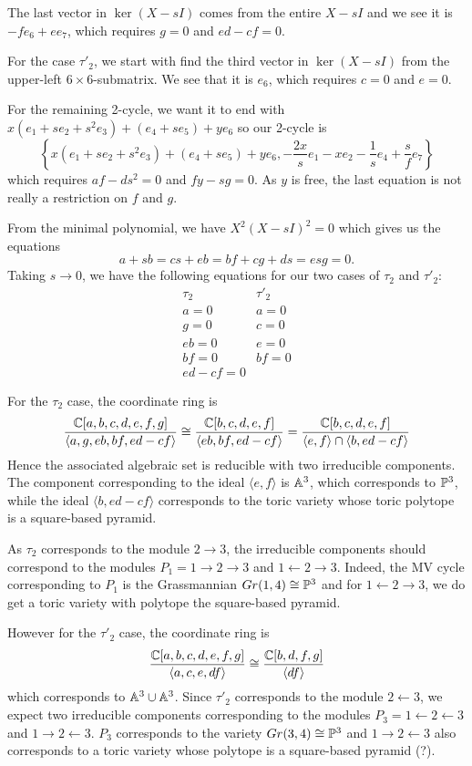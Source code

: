 \documentclass{article}
\begin{document}
\begin{example}[Roger]
The last vector in $\ker(X-sI)$ comes from the entire $X-sI$ and we see it is $-fe_6 + ee_7$, which requires $g=0$ and $ed-cf=0$.

For the case $\tau'_2$, we start with find the third vector in $\ker(X-sI)$ from the upper-left $6 \times 6$-submatrix. We see that it is $e_6$, which requires $c = 0$ and $e = 0$. 

For the remaining 2-cycle, we want it to end with $x(e_1 + se_2 + s^2e_3) + (e_4 + se_5) + ye_6$ so our 2-cycle is
\[
\left\{ x(e_1 + se_2 + s^2e_3) + (e_4 + se_5) + ye_6, -\frac{2x}{s}e_1 -xe_2 -\frac{1}{s}e_4 +\frac{s}{f} e_7\right\}
\]
which requires $af-ds^2=0$ and $fy-sg = 0$. As $y$ is free, the last equation is not really a restriction on $f$ and $g$.

From the minimal polynomial, we have $X^2 (X-sI)^2 = 0$ which gives us the equations
\[
a+sb = cs+eb = bf+cg+ds = esg = 0.
\]
Taking $s\rightarrow 0$, we have the following equations for our two cases of $\tau_2$ and $\tau'_2$:
\[
\begin{array}{c|c}
    \tau_2 & \tau'_2 \\ \hline
    a = 0 & a = 0 \\
    g = 0 & c = 0 \\
    eb = 0 & e = 0 \\
    bf = 0 & bf = 0 \\
    ed-cf = 0 & 
\end{array}
\]

For the $\tau_2$ case, the coordinate ring is 
\[
\frac{\CC[a,b,c,d,e,f,g]}{\langle a,g,eb,bf,ed-cf \rangle}
\cong \frac{\CC[b,c,d,e,f]}{\langle eb,bf,ed-cf \rangle}
= \frac{\CC[b,c,d,e,f]}{\langle e,f \rangle \cap \langle b,ed-cf \rangle}
\]
Hence the associated algebraic set is reducible with two irreducible components. The component corresponding to the ideal $\langle e,f \rangle$ is $\AA^3$, which corresponds to $\PP^3$, while the ideal $\langle b,ed-cf \rangle$ corresponds to the toric variety whose toric polytope is a square-based pyramid. 

As $\tau_2$ corresponds to the module $2 \rightarrow 3$, the irreducible components should correspond to the modules $P_1 = 1 \rightarrow 2 \rightarrow 3$ and $1 \leftarrow 2 \rightarrow 3$. Indeed, the MV cycle corresponding to $P_1$ is the Grassmannian $Gr(1,4) \cong \PP^3$ and for $1 \leftarrow 2 \rightarrow 3$, we do get a toric variety with polytope the square-based pyramid.

However for the $\tau'_2$ case, the coordinate ring is 
\[
\frac {\CC[a,b,c,d,e,f,g]}{\langle a,c,e,df \rangle}
\cong \frac{\CC[b,d,f,g]}{\langle df \rangle}
\]
which corresponds to $\AA^3 \cup \AA^3$. Since $\tau'_2$ corresponds to the module $2\leftarrow 3$, we expect two irreducible components corresponding to the modules $P_3 = 1 \leftarrow 2 \leftarrow 3$ and $1 \rightarrow 2 \leftarrow 3$. $P_3$ corresponds to the variety $Gr(3,4) \cong \PP^3$ and $1 \rightarrow 2 \leftarrow 3$ also corresponds to a toric variety whose polytope is a square-based pyramid (?).
\end{example}
\end{document}
